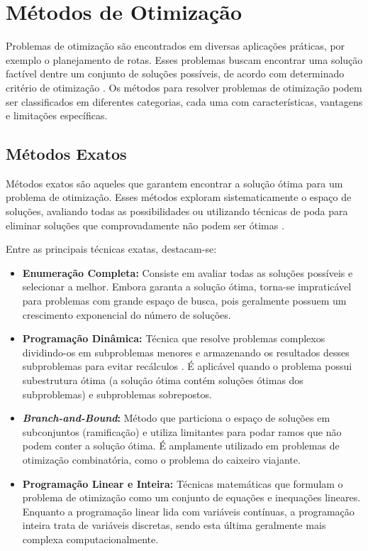 \section{Métodos de Otimização}

Problemas de otimização são encontrados em diversas aplicações 
práticas, por exemplo o planejamento de rotas. Esses problemas 
buscam encontrar uma solução factível dentre um conjunto de soluções possíveis, de acordo com 
determinado critério de otimização \cite{CORMEN2012}. Os métodos para resolver problemas 
de otimização podem ser classificados em diferentes categorias, cada uma com características, 
vantagens e limitações específicas.

\subsection{Métodos Exatos}

Métodos exatos são aqueles que garantem encontrar a solução ótima para um problema de 
otimização. Esses métodos exploram sistematicamente o espaço de soluções, avaliando todas 
as possibilidades ou utilizando técnicas de poda para eliminar soluções que comprovadamente 
não podem ser ótimas \cite{CORMEN2012}.

Entre as principais técnicas exatas, destacam-se:

\begin{itemize}
    \item \textbf{Enumeração Completa:} Consiste em avaliar todas as soluções possíveis e 
    selecionar a melhor. Embora garanta a solução ótima, torna-se impraticável para problemas 
    com grande espaço de busca, pois geralmente possuem um crescimento exponencial do número de soluções.
    
    \item \textbf{Programação Dinâmica:} Técnica que resolve problemas complexos dividindo-os 
    em subproblemas menores e armazenando os resultados desses subproblemas para evitar 
    recálculos \cite{CORMEN2012}. É aplicável quando o problema possui subestrutura ótima 
    (a solução ótima contém soluções ótimas dos subproblemas) e subproblemas sobrepostos.
    
    \item \textbf{\textit{Branch-and-Bound}:} Método que particiona o espaço de soluções em 
    subconjuntos (ramificação) e utiliza limitantes para podar ramos que não podem conter a 
    solução ótima. É amplamente utilizado em problemas de otimização combinatória, como o 
    problema do caixeiro viajante.
    
    \item \textbf{Programação Linear e Inteira:} Técnicas matemáticas que formulam o problema 
    de otimização como um conjunto de equações e inequações lineares. Enquanto a programação 
    linear lida com variáveis contínuas, a programação inteira trata de variáveis discretas, sendo 
    esta última geralmente mais complexa computacionalmente.
\end{itemize}

